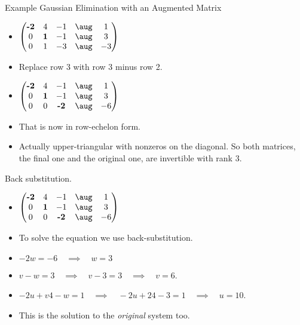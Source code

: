 \documentclass{beamer}
\begin{document}

\begin{frame}{Example Gaussian Elimination with an Augmented Matrix}

\begin{itemize}
\item $
\begin{pmatrix}
\textbf{-2} &         4  & -1  &  \aug & 1  \\
        0   & \textbf{1} & -1  &  \aug & 3  \\
        0   &         1  & -3  &  \aug & -3  \\
\end{pmatrix}
$
\item Replace row 3 with row 3 minus row 2.
\item $
\begin{pmatrix}
\textbf{-2} &         4  &          -1  &  \aug & 1  \\
        0   & \textbf{1} &          -1  &  \aug & 3  \\
        0   &         0  & \textbf{-2}  &  \aug & -6  \\
\end{pmatrix}
$
\item That is now in row-echelon form.
\item Actually upper-triangular with nonzeros on the diagonal. So both matrices,
the final one and the original one, are invertible with rank 3.
\end{itemize}
\end{frame}


\begin{frame}{Back substitution.}

\begin{itemize}
\item $
\begin{pmatrix}
\textbf{-2} &         4  &          -1  &  \aug & 1  \\
        0   & \textbf{1} &          -1  &  \aug & 3  \\
        0   &         0  & \textbf{-2}  &  \aug & -6  \\
\end{pmatrix}
$
\item To solve the equation we use back-substitution.
\item $-2 w = -6 \quad \implies \quad w = 3$
\item $v - w = 3 \quad \implies \quad v - 3 = 3 \quad \implies \quad v=6$.
\item $-2 u + v4 -w  = 1 \quad \implies \quad -2u +24 - 3 = 1 \quad \implies \quad u = 10$.
\item This is the solution to the \emph{original} system too.
\end{itemize}
\end{frame}
\end{document}
